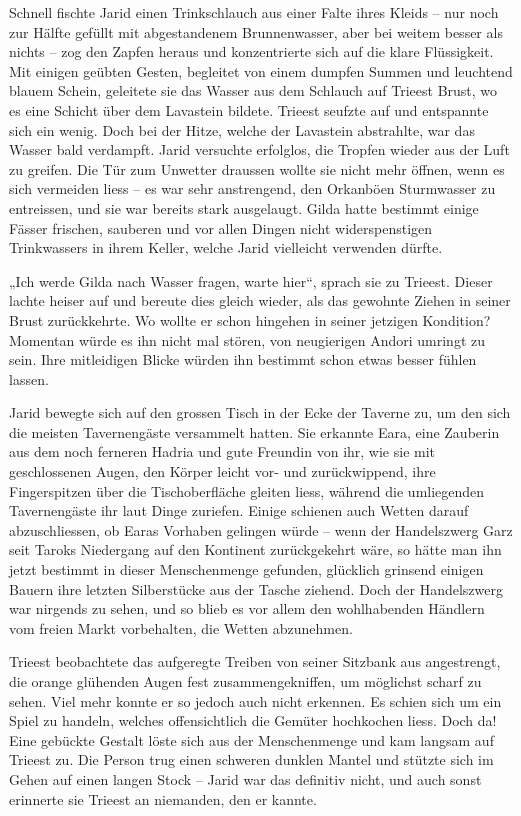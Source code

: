 Schnell fischte Jarid einen Trinkschlauch aus einer Falte ihres Kleids – nur noch zur Hälfte gefüllt mit abgestandenem Brunnenwasser, aber bei weitem besser als nichts – zog den Zapfen heraus und konzentrierte sich auf die klare Flüssigkeit. Mit einigen geübten Gesten, begleitet von einem dumpfen Summen und leuchtend blauem Schein, geleitete sie das Wasser aus dem Schlauch auf Trieest Brust, wo es eine Schicht über dem Lavastein bildete. Trieest seufzte auf und entspannte sich ein wenig. Doch bei der Hitze, welche der Lavastein abstrahlte, war das Wasser bald verdampft. Jarid versuchte erfolglos, die Tropfen wieder aus der Luft zu greifen. Die Tür zum Unwetter draussen wollte sie nicht mehr öffnen, wenn es sich vermeiden liess – es war sehr anstrengend, den Orkanböen Sturmwasser zu entreissen, und sie war bereits stark ausgelaugt. Gilda hatte bestimmt einige Fässer frischen, sauberen und vor allen Dingen nicht widerspenstigen Trinkwassers in ihrem Keller, welche Jarid vielleicht verwenden dürfte.

„Ich werde Gilda nach Wasser fragen, warte hier“, sprach sie zu Trieest. Dieser lachte heiser auf und bereute dies gleich wieder, als das gewohnte Ziehen in seiner Brust zurückkehrte. Wo wollte er schon hingehen in seiner jetzigen Kondition? Momentan würde es ihn nicht mal stören, von neugierigen Andori umringt zu sein. Ihre mitleidigen Blicke würden ihn bestimmt schon etwas besser fühlen lassen.\bigskip



Jarid bewegte sich auf den grossen Tisch in der Ecke der Taverne zu, um den sich die meisten Tavernengäste versammelt hatten. Sie erkannte Eara, eine Zauberin aus dem noch ferneren Hadria und gute Freundin von ihr, wie sie mit geschlossenen Augen, den Körper leicht vor- und zurückwippend, ihre Fingerspitzen über die Tischoberfläche gleiten liess, während die umliegenden Tavernengäste ihr laut Dinge zuriefen. Einige schienen auch Wetten darauf abzuschliessen, ob Earas Vorhaben gelingen würde – wenn der Handelszwerg Garz seit Taroks Niedergang auf den Kontinent zurückgekehrt wäre, so hätte man ihn jetzt bestimmt in dieser Menschenmenge gefunden, glücklich grinsend einigen Bauern ihre letzten Silberstücke aus der Tasche ziehend. Doch der Handelszwerg war nirgends zu sehen, und so blieb es vor allem den wohlhabenden Händlern vom freien Markt vorbehalten, die Wetten abzunehmen.\bigskip




Trieest beobachtete das aufgeregte Treiben von seiner Sitzbank aus angestrengt, die orange glühenden Augen fest zusammengekniffen, um möglichst scharf zu sehen. Viel mehr konnte er so jedoch auch nicht erkennen. Es schien sich um ein Spiel zu handeln, welches offensichtlich die Gemüter hochkochen liess. Doch da! Eine gebückte Gestalt löste sich aus der Menschenmenge und kam langsam auf Trieest zu. Die Person trug einen schweren dunklen Mantel und stützte sich im Gehen auf einen langen Stock – Jarid war das definitiv nicht, und auch sonst erinnerte sie Trieest an niemanden, den er kannte.

